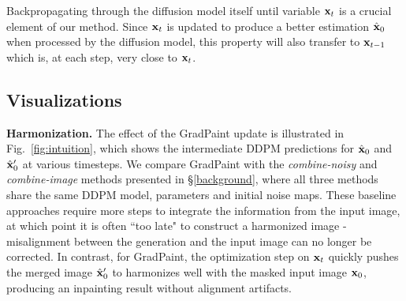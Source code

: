 Backpropagating through the diffusion model itself until variable $\mathbf{x}_t$ is a crucial element of our method. Since $\mathbf{x}_t$ is updated to produce a better estimation $\hat{\mathbf{x}}_0$ when processed by the diffusion model, this property will also transfer to $\mathbf{x}_{t-1}$ which is, at each step, very close to $\mathbf{x}_t$.












\subsection{Visualizations}

\noindent \textbf{Harmonization.} The effect of the GradPaint update is illustrated in Fig.~\ref{fig:intuition}, 
which shows the intermediate DDPM predictions for $\hat{\mathbf{x}}_0$ and $\hat{\mathbf{x}}_0'$ at various timesteps. We 
compare GradPaint with the \textit{combine-noisy} and \textit{combine-image} methods presented in \S\ref{background}, where all three methods share the same DDPM model, parameters and initial noise maps.
These baseline approaches require more steps to integrate the information from the input image, at which point it is often ``too late" to construct a harmonized image - misalignment between the generation and the input image can no longer be corrected. In contrast, for GradPaint, the optimization step on $\mathbf{x}_t$ quickly pushes the merged image $\hat{\mathbf{x}}_0'$ to harmonizes well with the masked input image $\mathbf{x}_0$, producing an inpainting result without alignment artifacts.

